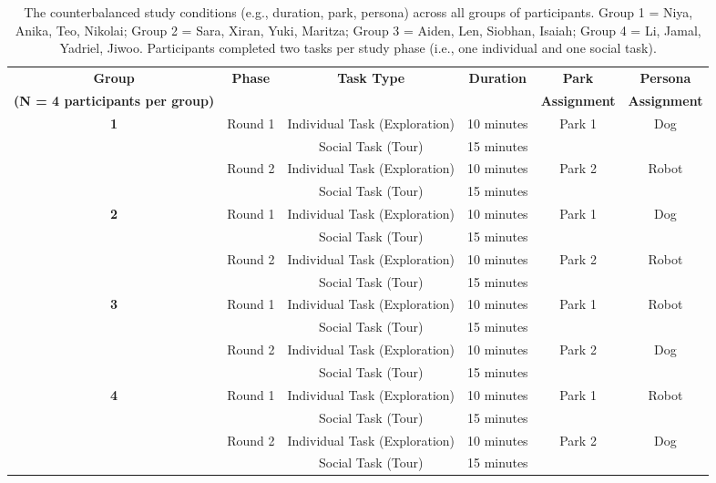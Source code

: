 \begin{table}[htbp]
\centering
\caption{\label{tab: Counterbalancing Procedures}The counterbalanced study conditions (e.g., duration, park, persona) across all groups of participants. Group 1 = Niya, Anika, Teo, Nikolai; Group 2 = Sara, Xiran, Yuki, Maritza; Group 3 = Aiden, Len, Siobhan, Isaiah; Group 4 = Li, Jamal, Yadriel, Jiwoo. Participants completed two tasks per study phase (i.e., one individual and one social task).}
\label{tab:study_conditions}
\setlength{\tabcolsep}{5pt} %
\begin{tabular}{cccccc}
\toprule
\textbf{Group} & \textbf{Phase} & \textbf{Task Type} & \textbf{Duration} & \textbf{Park} & \textbf{Persona} \\
\textbf{(N = 4 participants per group)} & & & & \textbf{Assignment} & \textbf{Assignment} \\
\midrule
\multirow{4}{*}{\textbf{1}} & \multirow{2}{*}{Round 1} & Individual Task (Exploration) & 10 minutes & \multirow{2}{*}{Park 1} & \multirow{2}{*}{Dog} \\
 & & Social Task (Tour) & 15 minutes & & \\
\cmidrule{2-6}
 & \multirow{2}{*}{Round 2} & Individual Task (Exploration) & 10 minutes & \multirow{2}{*}{Park 2} & \multirow{2}{*}{Robot} \\
 & & Social Task (Tour) & 15 minutes & & \\
\midrule
\multirow{4}{*}{\textbf{2}} & \multirow{2}{*}{Round 1} & Individual Task (Exploration) & 10 minutes & \multirow{2}{*}{Park 1} & \multirow{2}{*}{Dog} \\
 & & Social Task (Tour) & 15 minutes & & \\
\cmidrule{2-6}
 & \multirow{2}{*}{Round 2} & Individual Task (Exploration) & 10 minutes & \multirow{2}{*}{Park 2} & \multirow{2}{*}{Robot} \\
 & & Social Task (Tour) & 15 minutes & & \\
\midrule
\multirow{4}{*}{\textbf{3}} & \multirow{2}{*}{Round 1} & Individual Task (Exploration) & 10 minutes & \multirow{2}{*}{Park 1} & \multirow{2}{*}{Robot} \\
 & & Social Task (Tour) & 15 minutes & & \\
\cmidrule{2-6}
 & \multirow{2}{*}{Round 2} & Individual Task (Exploration) & 10 minutes & \multirow{2}{*}{Park 2} & \multirow{2}{*}{Dog} \\
 & & Social Task (Tour) & 15 minutes & & \\
\midrule
\multirow{4}{*}{\textbf{4}} & \multirow{2}{*}{Round 1} & Individual Task (Exploration) & 10 minutes & \multirow{2}{*}{Park 1} & \multirow{2}{*}{Robot} \\
 & & Social Task (Tour) & 15 minutes & & \\
\cmidrule{2-6}
 & \multirow{2}{*}{Round 2} & Individual Task (Exploration) & 10 minutes & \multirow{2}{*}{Park 2} & \multirow{2}{*}{Dog} \\
 & & Social Task (Tour) & 15 minutes & & \\
\bottomrule
\end{tabular}
\end{table}